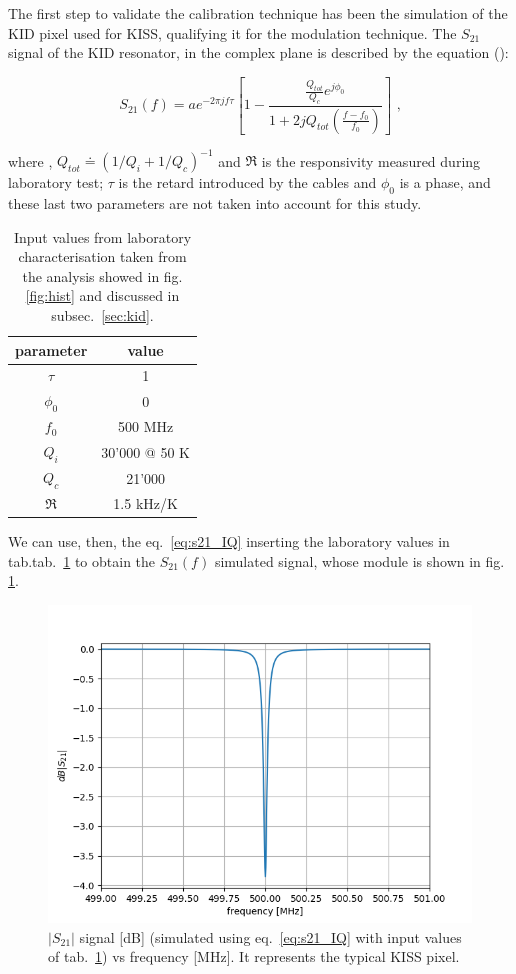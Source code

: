 \documentclass[twocolumn,traditabstract]{aa}\\
\begin{document}
The first step to validate the calibration technique has been the simulation of the KID pixel used for KISS, qualifying it for the modulation technique.
The $S_{21}$ signal of the KID resonator, in the complex plane is described by the equation (\cite{Gao}):

\begin{equation}
S_{21}(f)=ae^{-2\pi j f \tau} \left[ 1-\frac{\frac{Q_{tot}}{Q_c}e^{j\phi_0}}{1+2jQ_{tot}\left(\frac{f-f_0}{f_0}\right)}\right] \text{ ,}
\label{eq:s21_IQ}
\end{equation}

\noindent where , $Q_{tot}\doteq\left( 1/Q_i + 1/Q_c \right)^{-1}$ and $\mathfrak{R}$ is the responsivity measured during laboratory test; $\tau$ is the retard introduced by the cables and $\phi_0$ is a phase, and these last two parameters are not taken into account for this study.

\begin{table}[htf]
	\footnotesize
	\centering
	\caption{Input values from laboratory characterisation taken from the analysis showed in fig. \ref{fig:hist} and discussed in subsec.~\ref{sec:kid}.}
	\begin{tabular}{cc}
		\toprule
		\textbf{parameter} & \textbf{value} \\
		\toprule
		$\tau$ & 1 \\ 
		\midrule 
		$\phi_0$ & 0 \\
		\midrule
		$f_0$ & 500 MHz \\  
		\midrule 
		$Q_i$ & 30'000 @ 50 K \\ 
		\midrule 
		$Q_c$ & 21'000 \\ 
		\midrule 
		$\mathfrak{R}$  & 1.5 kHz/K \\ 
		\bottomrule
	\end{tabular}
	\label{tab:s21_values}
\end{table}

\noindent We can use, then, the eq.~\ref{eq:s21_IQ} inserting the laboratory values in tab.tab.~\ref{tab:s21_values} to obtain the $S_{21}(f)$ simulated signal, whose module is shown in fig. \ref{fig:s21_simu}.

\begin{figure}[htf]
	\centering
	\includegraphics[width=.5\textwidth]{3.acqui/resonance.png}
	\caption{$\left|S_{21} \right|$ signal [dB] (simulated using eq.~\ref{eq:s21_IQ} with input values of tab.~\ref{tab:s21_values}) vs frequency [MHz]. It represents the typical KISS pixel. }
	\label{fig:s21_simu}
\end{figure}
\end{document}
